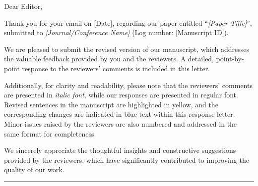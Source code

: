 \documentclass{ar2rc}
\begin{document}
    \responseletterheader

    \begin{flushleft}
        Dear Editor,
    \end{flushleft}

    \vspace{1em}



    Thank you for your email on [Date], regarding our paper entitled
    ``\textit{[Paper Title]}'',
    submitted to \textit{[Journal/Conference Name]} (Log number: [Manuscript ID]).

    We are pleased to submit the revised version of our manuscript, which addresses
    the valuable feedback provided by you and the reviewers. A detailed, point-by-point
    response to the reviewers' comments is included in this letter.

    \vspace{1em}

    Additionally, for clarity and readability, please note that the reviewers'
    comments are presented in \textit{italic font}, while our responses are
    presented in \textnormal{regular font}. Revised sentences in the manuscript are
    highlighted in yellow, and the corresponding changes are indicated in blue text
    within this response letter. Minor issues raised by the reviewers are also numbered
    and addressed in the same format for completeness.

    \vspace{1em}

    We sincerely appreciate the thoughtful insights and constructive suggestions
    provided by the reviewers, which have significantly contributed to improving
    the quality of our work.

    \vspace{2em}

    \responselettersignature

    \vspace{2em}
    \hrule
    \vspace{2em}

    
    
    
    
    
\end{document}
